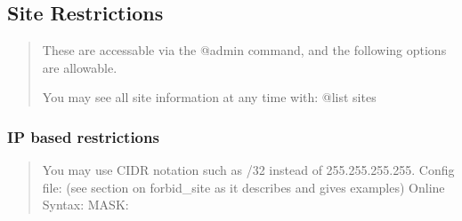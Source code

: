 \documentclass[letterpaper,10pt,english]{sphinxmanual}
\begin{document}
\subsection{Site Restrictions}
\label{\detokenize{security:site-restrictions}}\begin{quote}

\sphinxAtStartPar
These are accessable via the @admin command, and the following options are
allowable.

\sphinxAtStartPar
You may see all site information at any time with: @list sites
\end{quote}


\subsubsection{IP based restrictions}
\label{\detokenize{security:ip-based-restrictions}}\begin{quote}

\sphinxAtStartPar
You may use CIDR notation such as /32 instead of 255.255.255.255.
Config file:  (see section on forbid\_site as it describes and gives examples)
Online Syntax: MASK:

\begin{sphinxVerbatim}[commandchars=\\\{\}]
                     
                     


                     
                     

    

                    
                    


\end{sphinxVerbatim}
\end{quote}
\end{document}
